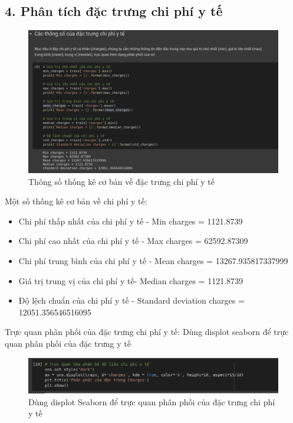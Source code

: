 \documentclass{article}
\begin{document}
	\subsection{4. Phân tích đặc trưng chi phí y tế}
	\begin{figure}[H]
		\centering
		\includegraphics[width=1\textwidth]{images/medical_charges.png}
		\caption{Thông số thống kê cơ bản về đặc trưng chi phí y tế}
		\label{fig:writing-thesis-medical-charges}
	\end{figure}
	Một số thống kê cơ bản về chi phí y tế:
	\begin{itemize}
		\item  Chi phí thấp nhất của chi phí y tế - Min charges = 1121.8739
		\item  Chi phí cao nhất của chi phí y tế - Max charges = 62592.87309
		\item  Chi phí trung bình của chi phí y tế - Mean charges = 13267.935817337999
		\item  Giá trị trung vị của chi phí y tế- Median charges = 1121.8739
		\item  Độ lệch chuẩn của chi phí y tế - Standard deviation charges = 12051.356546516095
	\end{itemize}
	Trực quan phân phối của đặc trưng chi phí y tế: Dùng displot seaborn để trực quan phân phối của đặc trưng y tế
	\begin{figure}[H]
		\centering
		\includegraphics[width=1\textwidth]{images/dist_medical_charges.png}
		\caption{Dùng displot Seaborn để trực quan phân phối của đặc trưng chi phí y tế}
		\label{fig:writing-thesis-dist-medical-charges}
	\end{figure}
	
\end{document}
